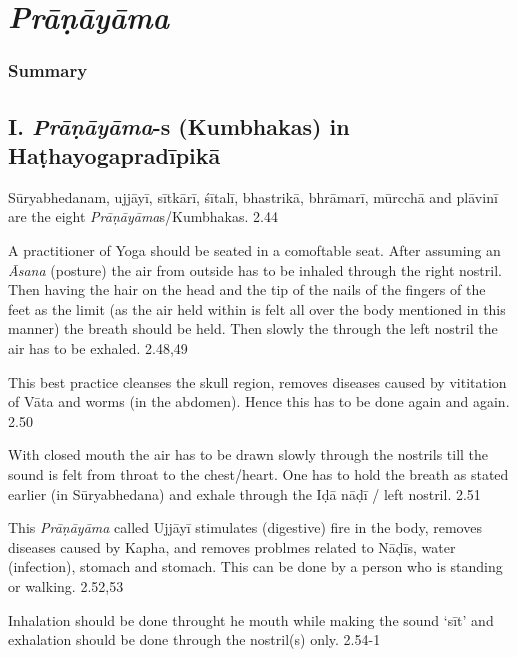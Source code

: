\chapter{\textit{Prāṇāyāma}}

\subsection*{Summary}

\section*{I. \textit{Prāṇāyāma}-s (Kumbhakas) in Haṭhayogapradī\-pikā}

Sūryabhedanam, ujjāyī, sītkārī, śītalī, bhastrikā, bhrāmarī, mūrcchā and plāvinī are the eight \textit{Prāṇāyāma}s/Kumbhakas. 2.44


A practitioner of Yoga should be seated in a comoftable seat. After assuming an \textit{Āsana} (posture) the air from outside has to be inhaled through the right nostril.  Then having the hair on the head and the tip of the nails of the fingers of the feet as the limit (as the air held within is felt all over the body mentioned in this manner) the breath should be held. Then slowly the through the left nostril the air has to be exhaled.  2.48,49


This best practice cleanses the skull region, removes diseases caused by vititation of Vāta and worms (in the abdomen). Hence this has to be done again and again. 2.50


With closed mouth the air has to be drawn slowly through the nostrils till the sound is felt from throat to the chest/heart. One has to hold the breath as stated earlier (in Sūryabhedana) and exhale through the Iḍā nāḍī / left nostril. 2.51


This \textit{Prāṇāyāma} called Ujjāyī stimulates (digestive) fire in the body, removes diseases caused by Kapha, and removes problmes related to Nāḍīs, water (infection), stomach and stomach. This can be done by a person who is standing or walking.  2.52,53


Inhalation should be done throught he mouth while making the sound ‘sīt’ and exhalation should be done through the nostril(s) only. 2.54-1

